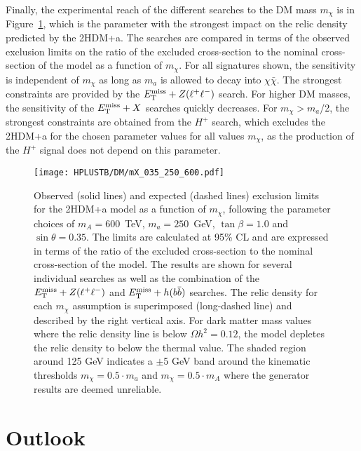Finally, the experimental reach of the different searches to the DM mass $m_\chi$ is in Figure~\ref{Hplustb:2HDMa_mchi}, which is the parameter with the strongest impact on the relic density predicted by the 2HDM+a. The searches are compared in terms of the observed exclusion limits on the ratio of the excluded cross-section to the nominal cross-section of the model as a function of $m_\chi$. For all signatures shown, the sensitivity is independent of $m_\chi$ as long as $m_a$ is allowed to decay into $\chi\bar{\chi}$. The strongest constraints are provided by the $E_{\text{T}}^{\text{miss}}+ Z(\ell^+\ell^-)$ search. For higher DM masses, the sensitivity of the $E_{\text{T}}^{\text{miss}}+X$ searches quickly decreases. For $m_\chi>m_a$/2, the strongest constraints are obtained from the $H^+$ search, which excludes the 2HDM+a for the chosen parameter values for all values $m_\chi$, as the production of the $H^+$ signal does not depend on this parameter.

\begin{figure}[htb]
    \RawFloats
    \centering
    \texttt{[image: HPLUSTB/DM/mX\_035\_250\_600.pdf]}
    \caption{Observed (solid lines) and expected (dashed lines) exclusion limits for the 2HDM+a model as a function of $m_\chi$, following the parameter choices of $m_A = 600$~TeV, $m_a = 250$~GeV, $\tan\beta= 1.0$ and $\sin\theta=0.35$. The limits are calculated at 95\% CL and are expressed in terms of the ratio of the excluded cross-section to the nominal cross-section of the model. The results are shown for several individual searches as well as the combination of the $E_{\text{T}}^{\text{miss}}+Z(\ell^+\ell^-)$ and $E_{\text{T}}^{\text{miss}}+h(b\bar{b})$ searches. The relic density for each $m_\chi$ assumption is superimposed (long-dashed line) and described by the right vertical axis. For dark matter mass values where the relic density line is below $\Omega h^2=0.12$, the model depletes the relic density to below the thermal value. The shaded region around 125 GeV indicates a $\pm$5 GeV band around the kinematic thresholds $m_\chi= 0.5 \cdot m_a$ and $m_\chi = 0.5 \cdot m_A$ where the generator
    results are deemed unreliable.}
    \label{Hplustb:2HDMa_mchi}
\end{figure}

\section{Outlook}

